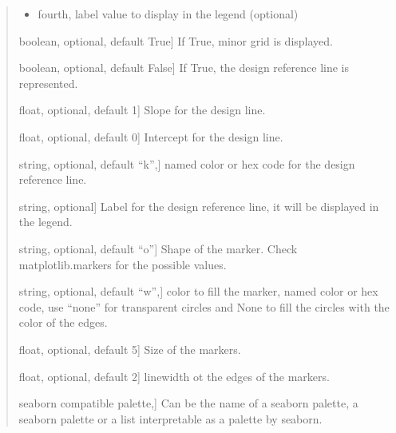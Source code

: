 \documentclass[letterpaper,10pt,english]{sphinxmanual}
\begin{document}
\begin{fulllineitems}
\begin{quote}
\begin{description}
\begin{description}
\begin{itemize}
\item {} 
fourth, label value to display in the legend (optional)

\end{itemize}

\item[{\sphinxstylestrong{gridMinor}}] \leavevmode{[}boolean, optional, default True{]}
If True, minor grid is displayed.

\item[{\sphinxstylestrong{designLine}}] \leavevmode{[}boolean, optional, default False{]}
If True, the design reference line is represented.

\item[{\sphinxstylestrong{designSlope}}] \leavevmode{[}float, optional, default 1{]}
Slope for the design line.

\item[{\sphinxstylestrong{designIntercept}}] \leavevmode{[}float, optional, default 0{]}
Intercept for the design line.

\item[{\sphinxstylestrong{designColor}}] \leavevmode{[}string, optional, default “k”,{]}
named color or hex code for the 
design reference line.

\item[{\sphinxstylestrong{designLabel}}] \leavevmode{[}string, optional{]}
Label for the design reference line, 
it will be displayed in the legend.

\item[{\sphinxstylestrong{markerShape}}] \leavevmode{[}string, optional, default “o”{]}
Shape of the marker. 
Check matplotlib.markers for the possible values.

\item[{\sphinxstylestrong{markerFill}}] \leavevmode{[}string, optional, default “w”,{]}
color to fill the marker, 
named color or hex code, use “none” for transparent circles and
None to fill the circles with the color of the edges.

\item[{\sphinxstylestrong{markerSize}}] \leavevmode{[}float, optional, default 5{]}
Size of the markers.

\item[{\sphinxstylestrong{markerEdgeWidth}}] \leavevmode{[}float, optional, default 2{]}
linewidth ot the edges of the markers.

\item[{\sphinxstylestrong{palette}}] \leavevmode{[}seaborn compatible palette,{]}
Can be the name of a seaborn palette, 
a seaborn palette or a list 
interpretable as a palette by seaborn.


\end{description}
\end{description}
\end{quote}
\end{fulllineitems}
\end{document}
